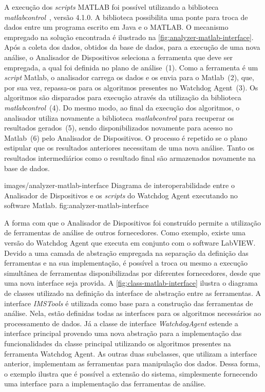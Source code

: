 A execução dos \textit{scripts} MATLAB foi possível utilizando a biblioteca
\emph{matlabcontrol}~\cite{matlabcontrol2013homepage}, versão 4.1.0. A biblioteca possibilita uma
ponte para troca de dados entre um programa escrito em Java e o MATLAB. O mecanismo empregado na
solução encontrada é ilustrado na \cref{fig:analyzer-matlab-interface}. Após a coleta dos dados,
obtidos da base de dados, para a execução de uma nova análise, o Analisador de Dispositivos
seleciona a ferramenta que deve ser empregada, a qual foi definida no plano de análise~(1). Como a
ferramenta é um \textit{script} Matlab, o analisador carrega os dados e os envia para o Matlab~(2),
que, por sua vez, repassa-os para os algoritmos presentes no Watchdog Agent~(3). Os algoritmos são
disparados para execução através da utilização da biblioteca \emph{matlabcontrol}~(4). Do mesmo
modo, ao final da execução dos algoritmos, o analisador utiliza novamente a biblioteca
\emph{matlabcontrol} para recuperar os resultados gerados~(5), sendo disponibilizados novamente para
acesso no Matlab~(6) pelo Analisador de Dispositivos. O processo é repetido se o plano estipular que
os resultados anteriores necessitam de uma nova análise. Tanto os resultados intermediários como o
resultado final são armazenados novamente na base de dados.

  {images/analyzer-matlab-interface}
  {Diagrama de interoperabilidade entre o Analisador de Dispositivos e os \textit{scripts} do
      Watchdog Agent executando no software Matlab.}
  {fig:analyzer-matlab-interface}

A forma com que o Analisador de Dispositivos foi construído permite a utilização de ferramentas de
análise de outros fornecedores. Como exemplo, existe uma versão do Watchdog Agent que executa em
conjunto com o software LabVIEW. Devido a uma camada de abstração empregada na separação da
definição das ferramentas e na sua implementação, é possível a troca ou mesmo a execução simultânea
de ferramentas disponibilizadas por diferentes fornecedores, desde que uma nova interface seja
provida. A \cref{fig:class-matlab-interface} ilustra o diagrama de classes utilizado na definição da
interface de abstração entre as ferramentas. A interface \emph{IMSTools} é utilizada como base para
a construção das ferramentas de análise. Nela, estão definidas todas as interfaces para os
algoritmos necessários ao processamento de dados. Já a classe de interface \emph{WatchdogAgent}
estende a interface principal provendo uma nova abstração para a implementação das funcionalidades
da classe principal utilizando os algoritmos presentes na ferramenta Watchdog Agent. As outras duas
subclasses, que utilizam a interface anterior, implementam as ferramentas para manipulação dos
dados. Dessa forma, o exemplo ilustra que é possível a extensão do sistema, simplesmente fornecendo
uma interface para a implementação das ferramentas de análise.

